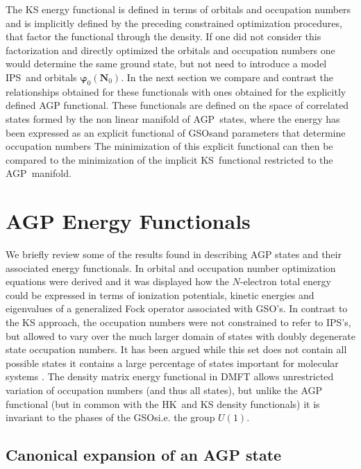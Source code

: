 \documentclass[aps,preprint]{revtex4}%
\begin{document}
The KS energy functional is defined in terms of orbitals and occupation
numbers and is implicitly defined by the preceding constrained optimization
procedures, that factor the functional through the density. If one did not
consider this factorization and directly optimized the orbitals and occupation
numbers one would determine the same ground state, but not need to introduce a
model IPS\ and orbitals $\boldsymbol{\varphi}_{0}\left(  \boldsymbol{N}%
_{0}\right)  $. In the next section we compare and contrast the relationships
obtained for these functionals with ones obtained for the explicitly defined
AGP functional. These functionals are defined on the space of correlated
states formed by the non linear manifold of AGP\ states, where the energy has
been expressed as an explicit functional of GSOsand parameters that determine
occupation numbers \cite{OrtizWeiner2006} The minimization of this explicit
functional can then be compared to the minimization of the implicit
KS\ functional restricted to the AGP\ manifold.

\section{AGP Energy Functionals \label{AGP}}

We briefly review some of the results found in \cite{OrtizWeiner2006}
describing AGP states and their associated energy functionals. In
\cite{OrtizWeiner2006} orbital and occupation number optimization equations
were derived and it was displayed how the $N$-electron total energy could be
expressed in terms of ionization potentials, kinetic energies and eigenvalues
of a generalized Fock operator associated with GSO's. In contrast to the KS
approach, the occupation numbers were not constrained to refer to IPS's, but
allowed to vary over the much larger domain of states with doubly degenerate
state occupation numbers. It has been argued while this set does not contain
all possible states it contains a large percentage of states important for
molecular systems \cite{Kramers Deg}. The density matrix energy functional in
DMFT allows unrestricted variation of occupation numbers (and thus all
states), but unlike the AGP functional (but in common with the HK\ and KS
density functionals) it is invariant to the phases of the GSOsi.e. the group
$U\left(  1\right)  .$

\subsection{Canonical expansion of an AGP state}
\end{document}
